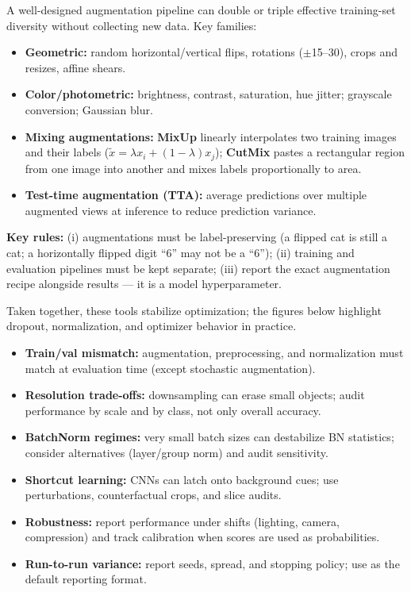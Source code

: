 \begin{tcolorbox}[summarybox, title={Data augmentation: expanding effective dataset size}]
A well-designed augmentation pipeline can double or triple effective training-set diversity without collecting new data. Key families:
\begin{itemize}
  \item \textbf{Geometric:} random horizontal/vertical flips, rotations ($\pm$15--30\textdegree), crops and resizes, affine shears.
  \item \textbf{Color/photometric:} brightness, contrast, saturation, hue jitter; grayscale conversion; Gaussian blur.
  \item \textbf{Mixing augmentations:} \textbf{MixUp} linearly interpolates two training images and their labels (\(\tilde{x}=\lambda x_i+(1-\lambda)x_j\)); \textbf{CutMix} pastes a rectangular region from one image into another and mixes labels proportionally to area.
  \item \textbf{Test-time augmentation (TTA):} average predictions over multiple augmented views at inference to reduce prediction variance.
\end{itemize}
\textbf{Key rules:} (i) augmentations must be label-preserving (a flipped cat is still a cat; a horizontally flipped digit ``6'' may not be a ``6''); (ii) training and evaluation pipelines must be kept separate; (iii) report the exact augmentation recipe alongside results --- it is a model hyperparameter.
\end{tcolorbox}

Taken together, these tools stabilize optimization; the figures below highlight dropout, normalization, and optimizer behavior in practice.

\begin{tcolorbox}[summarybox, title={Risk \& audit}]
\begin{itemize}
    \item \textbf{Train/val mismatch:} augmentation, preprocessing, and normalization must match at evaluation time (except stochastic augmentation).
    \item \textbf{Resolution trade-offs:} downsampling can erase small objects; audit performance by scale and by class, not only overall accuracy.
    \item \textbf{BatchNorm regimes:} very small batch sizes can destabilize BN statistics; consider alternatives (layer/group norm) and audit sensitivity.
    \item \textbf{Shortcut learning:} CNNs can latch onto background cues; use perturbations, counterfactual crops, and slice audits.
    \item \textbf{Robustness:} report performance under shifts (lighting, camera, compression) and track calibration when scores are used as probabilities.
    \item \textbf{Run-to-run variance:} report seeds, spread, and stopping policy; use  as the default reporting format.
\end{itemize}
\end{tcolorbox}

